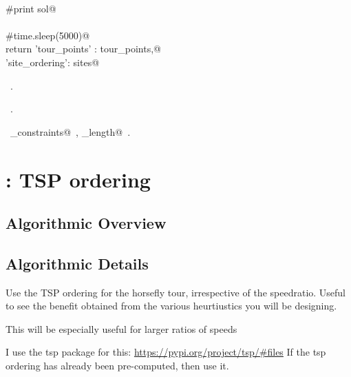 \documentclass[11.5pt]{report}
\begin{document}
\begin{flushleft}
\begin{list}{}{}
\mbox{}\verb@@\\
\mbox{}\verb@     #print sol@\\
\mbox{}\verb@@\\
\mbox{}\verb@     #time.sleep(5000)@\\
\mbox{}\verb@     return {'tour_points'  : tour_points,@\\
\mbox{}\verb@             'site_ordering': sites}@\\
\mbox{}\verb@@{\NWsep}
\end{list}
\vspace{-1.5ex}
\footnotesize
\begin{list}{}{\setlength{\itemsep}{-\parsep}\setlength{\itemindent}{-\leftmargin}}
\item \NWtxtMacroDefBy\ .
\item \NWtxtMacroRefIn\ .
\item \NWtxtIdentsUsed\nobreak\  \verb@generate_constraints@\nobreak\ , \verb@tour_length@\nobreak\ .
\item{}
\end{list}
\vspace{4ex}
\end{flushleft}
\section{: TSP ordering}
\subsection{Algorithmic Overview}
\subsection{Algorithmic Details}

\newchunk
Use the TSP ordering for the horsefly tour, irrespective 
of the speedratio. Useful to see the benefit obtained from 
the various heurtiustics you will be designing. 
    
This will be especially useful for larger ratios of speeds

I use the tsp package for this: \url{https://pypi.org/project/tsp/#files}
If the tsp ordering has already been pre-computed, then use it. 
\end{document}
